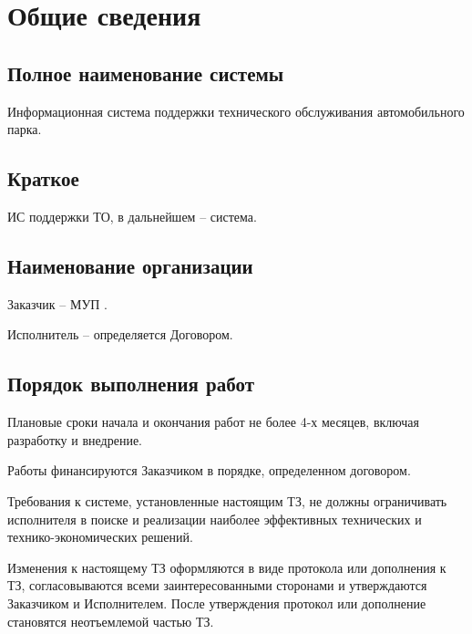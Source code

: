 \section{Общие сведения}
\subsection{Полное наименование системы}
Информационная система поддержки технического обслуживания автомобильного парка.

\subsection{Краткое}
ИС поддержки ТО, в дальнейшем -- система.

\subsection{Наименование организации}
Заказчик -- МУП .

Исполнитель -- определяется Договором.

\subsection{Порядок выполнения работ}
Плановые сроки начала и окончания работ не более 4-х месяцев, включая разработку
и внедрение.

Работы финансируются Заказчиком в порядке, определенном договором.

Требования к системе, установленные настоящим ТЗ, не должны ограничивать
исполнителя в поиске и реализации наиболее эффективных технических и
технико-экономических решений.

Изменения к настоящему ТЗ оформляются в виде протокола или дополнения к ТЗ,
согласовываются всеми заинтересованными сторонами и утверждаются Заказчиком и
Исполнителем. После утверждения протокол или дополнение становятся неотъемлемой
частью ТЗ.
